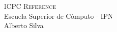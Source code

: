 \documentclass{article}
\begin{document}
\begin{center}
  \Huge\textsc{ICPC Reference}\\
  \vspace{0.30cm}
  \huge Escuela Superior de Cómputo - IPN\\
  \vspace{0.20cm}
  \small Alberto Silva
\end{center}
\hrulefill
\begin{multicols*}{2}
  \tableofcontents	
  \clearpage
  

  \newpage
  
  \newpage
  
  \newpage
  
\end{multicols*}
\end{document}
